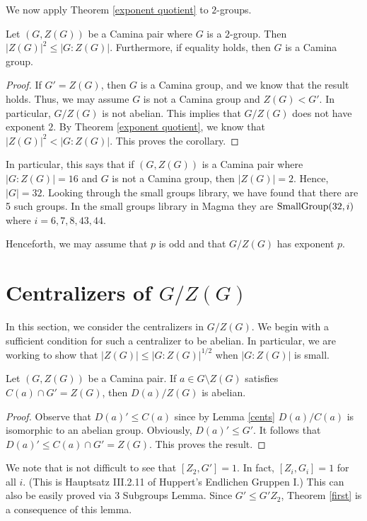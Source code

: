 We now apply Theorem \ref{exponent quotient} to $2$-groups.

\begin{corollary}
Let $(G,Z (G))$ be a Camina pair where $G$ is a $2$-group.  Then $|Z (G)|^2 \le |G:Z (G)|$.  Furthermore, if equality holds, then $G$ is a Camina group.
\end{corollary}

\begin{proof}
If $G' = Z (G)$, then $G$ is a Camina group, and we know that the result holds.  Thus, we may assume $G$ is not a Camina group and $Z (G) < G'$.  In particular, $G/Z (G)$ is not abelian. This implies that $G/Z (G)$ does not have exponent $2$.  By Theorem \ref{exponent quotient}, we know that $|Z (G)|^2 < |G:Z (G)|$.  This proves the corollary.
\end{proof}

In particular, this says that if $(G,Z (G))$ is a Camina pair where $|G:Z (G)| = 16$ and $G$ is not a Camina group, then $|Z (G)| = 2$.  Hence, $|G| = 32$.  Looking through the small groups library, we have found that there are 5 such groups.  In the small groups library in Magma they are ${\rm SmallGroup} (32,i)$ where $i = 6, 7, 8, 43, 44$.

Henceforth, we may assume that $p$ is odd and that $G/Z (G)$ has exponent $p$.

\section{Centralizers of $G/Z(G)$}

In this section, we consider the centralizers in $G/Z (G)$.  We begin with a sufficient condition for such a centralizer to be abelian.  In particular, we are working to show that $|Z (G)| \le |G:Z (G)|^{1/2}$ when $|G:Z (G)|$ is small.

\begin{lemma} \label{D-quo}
Let $(G,Z (G))$ be a Camina pair.  If $a \in G \setminus Z (G)$ satisfies $C (a) \cap G' = Z(G)$, then $D (a)/Z (G)$ is abelian.
\end{lemma}

\begin{proof}
Observe that $D (a)' \le C (a)$ since by Lemma \ref{cents} $D (a)/C (a)$ is isomorphic to an abelian group.  Obviously, $D (a)' \le G'$.  It follows that $D (a)' \le C (a) \cap G' = Z (G)$.  This proves the result.
\end{proof}

We note that is not difficult to see that $[Z_2,G'] = 1$.  In fact, $[Z_i,G_i] = 1$ for all $i$.  (This is Hauptsatz III.2.11 of Huppert's Endlichen Gruppen I.)  This can also be easily proved via 3 Subgroups Lemma.  Since $G' \le G' Z_2$, Theorem \ref{first} is a consequence of this lemma.

